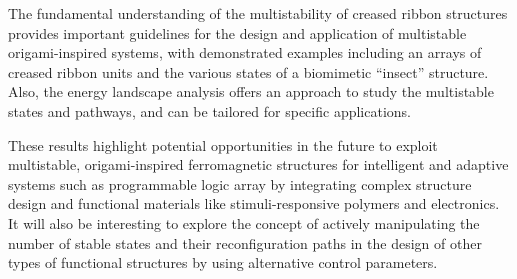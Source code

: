 The fundamental understanding of the multistability of creased ribbon structures provides important guidelines for the design and application of multistable origami-inspired systems, with demonstrated examples including an arrays of creased ribbon units and the various states of a biomimetic ``insect'' structure.
Also, the energy landscape analysis offers an approach to study the multistable states and pathways, and can be tailored for specific applications.

These results highlight potential opportunities in the future to exploit multistable, origami-inspired ferromagnetic structures for intelligent and adaptive systems such as programmable logic array by integrating complex structure design and functional materials like stimuli-responsive polymers and electronics.
It will also be interesting to explore the concept of actively manipulating the number of stable states and their reconfiguration paths in the design of other types of functional structures by using alternative control parameters.

